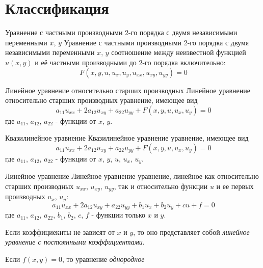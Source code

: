 \documentclass{article}[12pt]
\begin{document}
\section{Классификация}
\begin{definition}
    {Уравнение с частными производными 2-го порядка с двумя независимыми
    переменными $x$, $y$}
    {Уравнение с частными производными 2-го порядка с двумя независимыми
    переменными $x$, $y$}
    соотношение между неизвестной функцией $u(x,y)$ и её частными
    производными до 2-го порядка включительно:
    \begin{displaymath}
        F(x,y,u,u_{x},u_{y},u_{xx},u_{xy},u_{yy})=0
    \end{displaymath}
\end{definition}
\begin{definition}
    {Линейное уравнение относительно старших производных}
    {Линейное уравнение относительно старших производных}
    уравнение, имеющее вид
    \begin{displaymath}
        a_{11}u_{xx}+2a_{12}u_{xy}+a_{22}u_{yy}
        +F(x,y,u,u_{x},u_{y})=0
    \end{displaymath}
    где $a_{11}$, $a_{12}$, $a_{22}$ - функции от $x$, $y$.
\end{definition}
\begin{definition}
    {Квазилинейное уравнение}
    {Квазилинейное уравнение}
    уравнение, имеющее вид
    \begin{displaymath}
        a_{11}u_{xx}+2a_{12}u_{xy}+a_{22}u_{yy}
        +F(x,y,u,u_{x},u_{y})=0
    \end{displaymath}
    где $a_{11}$, $a_{12}$, $a_{22}$ - функции от $x$, $y$, $u$,
    $u_{x}$, $u_{y}$.
\end{definition}
\begin{definition}
    {Линейное уравнение}
    {Линейное уравнение}
    уравнение, линейное как относительно старших производных $u_{xx}$,
    $u_{xy}$, $u_{yy}$, так и относительно функции $u$ и ее первых
    производных $u_{x}$, $u_{y}$:
    \begin{displaymath}
        a_{11}u_{xx}+2a_{12}u_{xy}+a_{22}u_{yy}
        +b_{1}u_{x}+b_{2}u_{y}+cu+f=0
    \end{displaymath}
    где $a_{11}$, $a_{12}$, $a_{22}$, $b_{1}$, $b_{2}$, $c$, $f$ -
    функции только $x$ и $y$.
    \par Если коэффициекнты не зависят от $x$ и
    $y$, то оно представляет собой \textit{линейное уравнение с
    постоянными коэффициентами}.
    \par Если $f(x,y)=0$, то уравнение
    \textit{однородное}
\end{definition}
\end{document}
